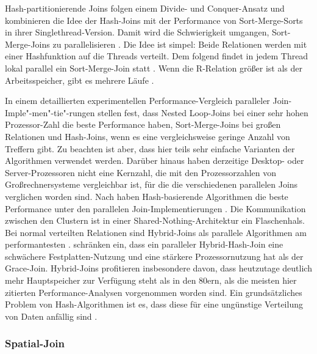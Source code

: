 \documentclass[a4paper,12pt,twoside]{article}
\begin{document}
Hash-partitionierende Joins folgen einem Divide- und Conquer-Ansatz und kombinieren die Idee der Hash-Joins mit der Performance von Sort-Merge-Sorts in ihrer Singlethread-Version. Damit wird die Schwierigkeit umgangen, Sort-Merge-Joins zu parallelisieren \parencite[S. 75ff]{Mishra1992}. Die Idee ist simpel: Beide Relationen werden mit einer Hashfunktion auf die Threads verteilt. Dem folgend findet in jedem Thread lokal parallel ein Sort-Merge-Join statt \parencite{Richardson1987}. Wenn die R-Relation größer ist als der Arbeitsspeicher, gibt es mehrere Läufe \parencite{Lu1990}.

In einem detaillierten experimentellen Performance-Vergleich paralleler Join-Imple"-men"-tie"-rungen stellen {\textcite{Valduriez1984}} fest, dass Nested Loop-Joins bei einer sehr hohen Prozessor-Zahl die beste Performance haben, Sort-Merge-Joins bei großen Relationen und Hash-Joins, wenn es eine vergleichsweise geringe Anzahl von Treffern gibt. Zu beachten ist aber, dass hier teils sehr einfache Varianten der Algorithmen verwendet werden. Darüber hinaus haben derzeitige Desktop- oder Server-Prozessoren nicht eine Kernzahl, die mit den Prozessorzahlen von Großrechnersysteme vergleichbar ist, für die die verschiedenen parallelen Joins verglichen worden sind. Nach {\textcite{Richardson1987}} haben Hash-basierende Algorithmen die beste Performance unter den parallelen Join-Implementierungen \parencite[vgl. auch ][]{Gerber1986}. Die Kommunikation zwischen den Clustern ist in einer Shared-Nothing-Architektur ein Flaschenhals. Bei normal verteilten Relationen sind Hybrid-Joins als parallele Algorithmen am performantesten \parencite{Schneider1989}. {\textcite{DeWitt1985}} schränken ein, dass ein paralleler Hybrid-Hash-Join eine schwächere Festplatten-Nutzung und eine stärkere Prozessornutzung hat als der Grace-Join. Hybrid-Joins profitieren insbesondere davon, dass heutzutage deutlich mehr Hauptspeicher zur Verfügung steht als in den 80ern, als die meisten hier zitierten Performance-Analysen vorgenommen worden sind. Ein grundsätzliches Problem von Hash-Algorithmen ist es, dass diese für eine ungünstige Verteilung von Daten anfällig sind \parencite{Lakshmi1990}.

\subsubsection{Spatial-Join}
\label{Spatial Join} 
\end{document}
